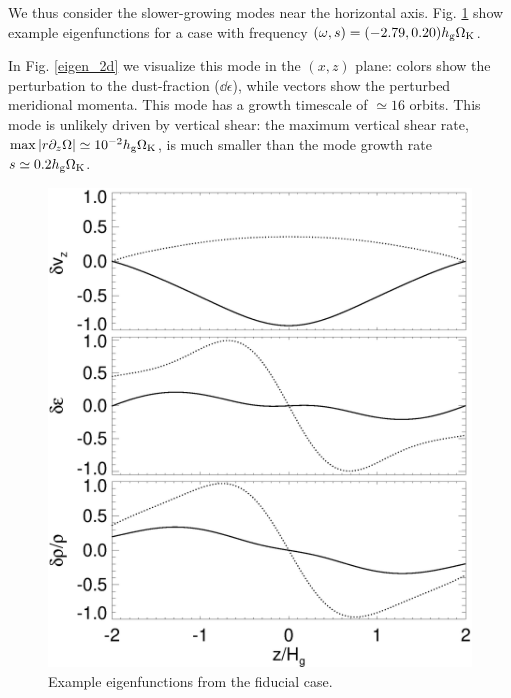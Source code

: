 We thus consider the slower-growing modes near the horizontal
axis. Fig. \ref{eigen_vec} show example eigenfunctions for a case with
frequency $(\omega,s)=(-2.79,0.20)h_\mathrm{g}\Omega_{\rm K}$. 


In Fig. \ref{eigen_2d}
we visualize this mode in the $(x,z)$ plane: colors show the
perturbation to the dust-fraction ($\dd\epsilon$), while vectors show
the perturbed meridional momenta. This mode has a growth
timescale of $\simeq 16$ orbits. This mode is unlikely driven by
vertical shear: the maximum vertical 
shear rate, $\mathrm{max}\left|r\partial_z\Omega\right|\simeq10^{-2}h_\mathrm{g}\Omega_{\rm K}$,
is much smaller than the mode growth rate $s\simeq 0.2h_\mathrm{g}\Omega_{\rm K}$. 

\begin{figure}
  \includegraphics[width=\linewidth]{figures/eigenvec}
  \caption{Example eigenfunctions from the fiducial case. 
    \label{eigen_vec}} 
\end{figure}

